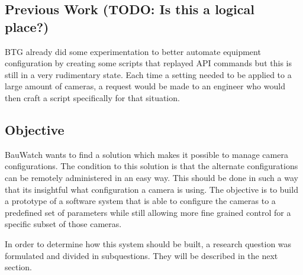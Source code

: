 % 

\subsection{Previous Work (TODO: Is this a logical place?)}
BTG already did some experimentation to better automate equipment configuration by creating some scripts that replayed API commands but this is still
in a very rudimentary state. Each time a setting needed to be applied to a large amount of cameras, a request would be made to an engineer who would then craft a script
specifically for that situation.

\subsection{Objective}
BauWatch wants to find a solution which makes it possible to manage camera configurations.
The condition to this solution is that the alternate configurations can be remotely administered in an easy way.
This should be done in such a way that its insightful what configuration a camera is using.
The objective is to build a prototype of a software system that is able to configure the cameras to a predefined set of parameters while still allowing
more fine grained control for a specific subset of those cameras.

In order to determine how this system should be built, a research question was formulated and divided in subquestions. They will be described in the next section.



